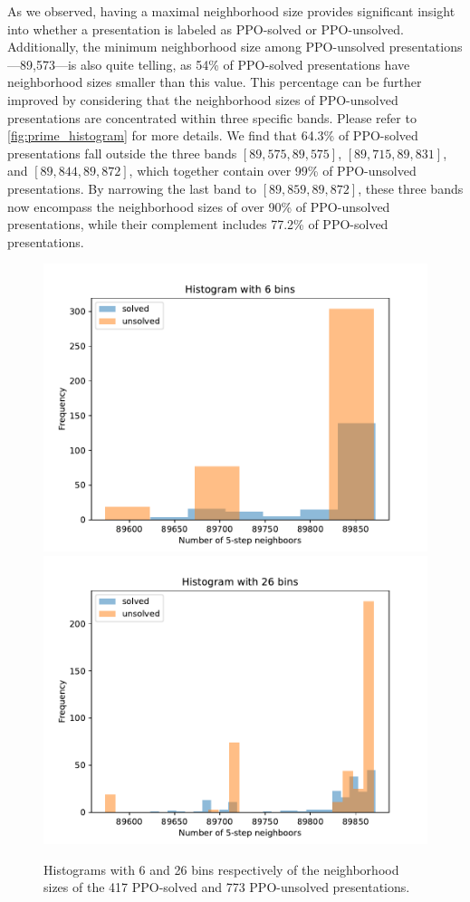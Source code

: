 As we observed, having a maximal neighborhood size provides significant insight into whether a presentation is labeled as PPO-solved or PPO-unsolved.
Additionally, the minimum neighborhood size among PPO-unsolved presentations—89,573—is also quite telling, as 54\% of PPO-solved presentations have neighborhood sizes smaller than this value.
This percentage can be further improved by considering that the neighborhood sizes of PPO-unsolved presentations are concentrated within three specific bands.
Please refer to \autoref{fig:prime_histogram} for more details.
We find that 64.3\% of PPO-solved presentations fall outside the three bands \([89,575, 89,575]\), \([89,715, 89,831]\), and \([89,844, 89,872]\), which together contain over 99\% of PPO-unsolved presentations.
By narrowing the last band to \([89,859, 89,872]\), these three bands now encompass the neighborhood sizes of over 90\% of PPO-unsolved presentations, while their complement includes 77.2\% of PPO-solved presentations.

\begin{figure}
	\centering
	\includegraphics[scale=.34]{fig/prime_histogram_rl.pdf}
	\includegraphics[scale=.34]{fig/prime_histogram_rl2.pdf}
	\caption{Histograms with 6 and 26 bins respectively of the neighborhood sizes of the 417 PPO-solved and 773 PPO-unsolved presentations.}
	\label{fig:prime_histogram}
\end{figure}

